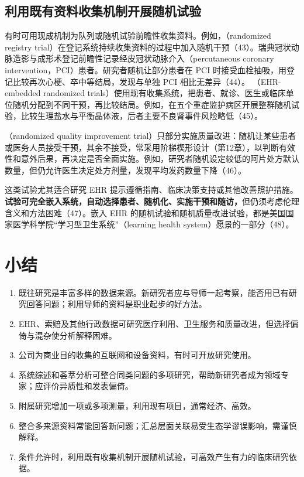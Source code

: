 \subsection{利用既有资料收集机制开展随机试验}
有时可用现成机制为队列或随机试验前瞻性收集资料。例如，（randomized registry trial）在登记系统持续收集资料的过程中加入随机干预（43）。瑞典冠状动脉造影与成形术登记前瞻性记录经皮冠状动脉介入（percutaneous coronary intervention，PCI）患者。研究者随机让部分患者在 PCI 时接受血栓抽吸，用登记比较再次心梗、卒中等结局，发现与单独 PCI 相比无差异（44）。
（EHR-embedded randomized trials）使用现有收集系统，把患者、就诊、医生或临床单位随机分配到不同干预，再比较结局。例如，在五个重症监护病区开展整群随机试验，比较生理盐水与平衡晶体液，后者主要不良肾事件风险略低（45）。

（randomized quality improvement trial）只部分实施质量改进：随机让某些患者或医务人员接受干预，其余不接受，常采用阶梯楔形设计（第12章），以判断有效性和意外后果，再决定是否全面实施。例如，研究者随机设定较低的阿片处方默认数量，但仍允许医生决定处方剂量，发现平均发药数量下降（46）。

这类试验尤其适合研究 EHR 提示遵循指南、临床决策支持或其他改善照护措施。\textbf{试验可完全嵌入系统，自动选择患者、随机化、实施干预和随访，}但仍须考虑伦理含义和方法困难（47）。嵌入 EHR 的随机试验和随机质量改进试验，都是美国国家医学科学院“学习型卫生系统”（learning health system）愿景的一部分（48）。

\section{小结}
\begin{enumerate}
\item 既往研究是丰富多样的数据来源。新研究者应与导师一起考察，能否用已有研究回答问题；利用导师的资料是职业起步的好方法。
\item EHR、索赔及其他行政数据可研究医疗利用、卫生服务和质量改进，但选择偏倚与混杂使分析解释困难。
\item 公司为商业目的收集的互联网和设备资料，有时可开放研究使用。
\item 系统综述和荟萃分析可整合同类问题的多项研究，帮助新研究者成为领域专家；应评价异质性和发表偏倚。
\item 附属研究增加一项或多项测量，利用现有项目，通常经济、高效。
\item 整合多来源资料常能回答新问题；汇总层面关联易受生态学谬误影响，需谨慎解释。
\item 条件允许时，利用既有收集机制开展随机试验，可高效产生有力的临床研究依据。
\end{enumerate}

